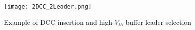 \begin{figure}[t!]
    \centering
    \texttt{[image: 2DCC\_2Leader.png]} %
    \caption{Example of DCC insertion and high-$V_{th}$ buffer leader selection}
    \label{fig:2dcc2leader}
\end{figure}